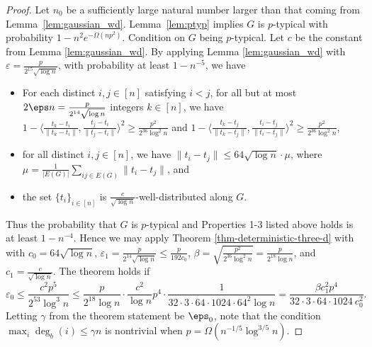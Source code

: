 \begin{proof}
Let $n_0$ be a sufficiently large natural number larger than
that coming from Lemma~\ref{lem:gaussian_wd}.
Lemma~\ref{lem:ptyp}  implies $G$ is $p$-typical with probability
$1 - n^2 e^{-\Omega(np^2)}$. Condition on $G$ being $p$-typical.
Let $c$ be the constant from Lemma \ref{lem:gaussian_wd}.
By applying Lemma \ref{lem:gaussian_wd}
with $\varepsilon=\frac{p}{2^{15}\sqrt{\log n}}$, with probability
at least $1-n^{-5}$, we have
\begin{itemize}
  \setlength{\itemsep}{1pt} \setlength{\parskip}{0pt}
  \setlength{\parsep}{0pt}
\item[1.] For each distinct $i,j \in [n]$ satisfying $i < j$, for all but at most $2 \eps n = \frac{p}{2^{14}\sqrt{\log n}}$ integers $k \in [n]$, we have $1 - \langle \frac{t_k - t_i}{\|t_k - t_i \|}, \frac{t_j - t_i}{\|t_j - t_i\|} \rangle^2 \ge \frac{p^2}{2^{36} \log^2 n}$ and $1 - \langle \frac{t_k - t_j}{\|t_k - t_j \|}, \frac{t_i - t_j}{\|t_i - t_j\|} \rangle^2 \ge \frac{p^2}{2^{36} \log^2 n}$,
\item[2.] for all distinct $i,j \in [n]$, we have $\|t_i - t_j\| \le 64\sqrt{\log n} \cdot \mu$, where $\mu = \frac{1}{|E(G)|} \sum_{ij \in E(G)} \|t_i - t_j\|$, and
\item[3.] the set $\{t_i\}_{i\in[n]}$ is $\frac{c}{\sqrt{\log n}}$-well-distributed along $G$.
\end{itemize}
Thus the probability that $G$ is $p$-typical and Properties 1-3 listed above holds
is at least $1 - n^{-4}$. 
Hence we may apply Theorem \ref{thm-deterministic-three-d} with with 
$c_{0}=64\sqrt{\log n}$,
$\varepsilon_{1}= \frac{p}{2^{14}\sqrt{\log n}} \le \frac{p}{192c_{0}}$,
$\beta=\sqrt{\frac{p^2}{2^{36}\log^{2}n}}=\frac{p}{2^{18}\log n}$,
and $c_{1}=\frac{c}{\sqrt{\log n}}$. The theorem holds if 
\[
	\varepsilon_{0}
	\le \frac{c^2p^5}{2^{53} \log^{3}n}
	\le  \frac{p}{2^{18}\log n} \cdot \frac{c^2}{\log n} p^4 \cdot \frac{1}{32 \cdot 3 \cdot 64 \cdot 1024 \cdot 64^2 \log n}
		= \frac{\beta c_1^2 p^4}{32 \cdot 3 \cdot 64 \cdot 1024\  c_0^2}.		
\]
Letting $\gamma$ from the theorem statement be $\eps_0$, note that the condition $\max_i \deg_b(i) \leq \gamma n$ is nontrivial when $p = \Omega(n^{-1/5} \log^{3/5} n)$.  \qedhere
\end{proof}







